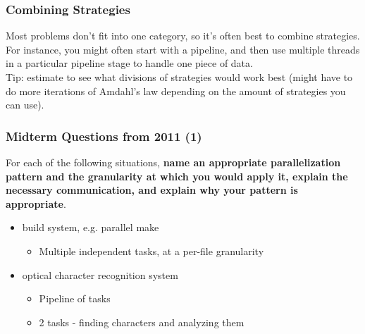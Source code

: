 \begin{frame}
  \frametitle{Combining Strategies}

  
    Most problems don't fit into one category, so it's often best to combine
      strategies.\\[1em]

    For instance, you might often start with a pipeline, and then use
      multiple threads in a particular pipeline stage to handle one piece of
      data.\\[1em]
    Tip: estimate to see what divisions of strategies would work best
      (might have to do more iterations of Amdahl's law depending on the amount
      of strategies you can use).
  

\end{frame}

\begin{frame}
  \frametitle{Midterm Questions from 2011 (1)}


  For each of the following situations, {\bf name an appropriate parallelization
  pattern and the granularity at which you would apply it, explain the necessary
  communication, and explain why your pattern is appropriate}.
  \begin{itemize}
  \item build system, e.g. parallel make
    \begin{itemize}
      \item<2-> Multiple independent tasks, at a per-file granularity
    \end{itemize}
  \item optical character recognition system
    \begin{itemize}
      \item<2-> Pipeline of tasks
      \item<2-> 2 tasks - finding characters and analyzing them
    \end{itemize}
  \end{itemize}

\end{frame}

